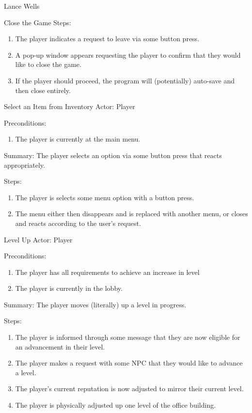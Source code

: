 \documentclass[12pt]{report}
\begin{document}
\begin{section}{Lance Wells}
\begin{subsection}{Close the Game}
Steps:
\begin{enumerate}
\item The player indicates a request to leave via some button press.
\item A pop-up window appears requesting the player to confirm that they
would like to close the game.
\item If the player should proceed, the program will (potentially) auto-save
and then close entirely.
\end{enumerate}
\end{subsection}

\begin{subsection}{Select an Item from Inventory}
Actor: Player

Preconditions:
\begin{enumerate}
\item The player is currently at the main menu.
\end{enumerate}

Summary: The player selects an option via some button press that reacts
appropriately.

Steps:
\begin{enumerate}
\item The player is selects some menu option with a button press.
\item The menu either then disappears and is replaced with another menu, or
closes and reacts according to the user's request.
\end{enumerate}
\end{subsection}

\begin{subsection}{Level Up}
Actor: Player

Preconditions:
\begin{enumerate}
\item The player has all requirements to achieve an increase in level
\item The player is currently in the lobby.
\end{enumerate}

Summary: The player moves (literally) up a level in progress.

Steps:
\begin{enumerate}
\item The player is informed through some message that they are now eligible
for an advancement in their level.
\item The player makes a request with some NPC that they would like to
advance a level.
\item The player's current reputation is now adjusted to mirror their
current level.
\item The player is physically adjusted up one level of the office building.
\end{enumerate}
\end{subsection}


\end{section}
\end{document}
